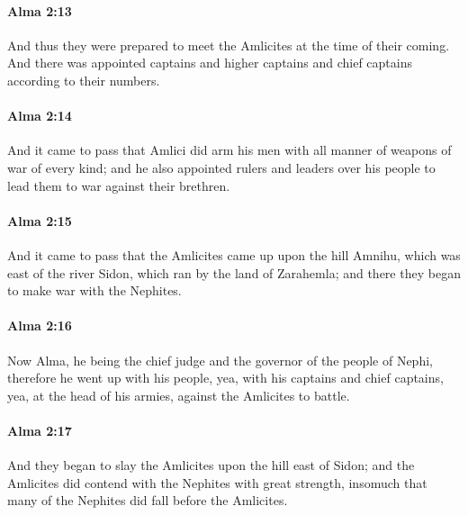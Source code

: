 		\paragraph{Alma 2:13} %
			\label{ALMA-2-13}

			And thus they were prepared to meet the Amlicites at the time of their coming.
			And there was appointed captains and higher captains and chief captains
			according to their numbers.

		\paragraph{Alma 2:14} %
			\label{ALMA-2-14}

			And it came to pass that Amlici did arm his men
			with all manner of weapons of war of every kind;
			and he also appointed rulers and leaders over his people
			to lead them to war against their brethren.

		\paragraph{Alma 2:15} %
			\label{ALMA-2-15}

			And it came to pass that the Amlicites came up upon the hill Amnihu,
			which was east of the river Sidon,
			which ran by the land of Zarahemla;
			and there they began to make war with the Nephites.

		\paragraph{Alma 2:16} %
			\label{ALMA-2-16}

			Now Alma, he being the chief judge and the governor of the people of Nephi,
			therefore he went up with his people,
			yea, with his captains and chief captains,
			yea, at the head of his armies,
			against the Amlicites to battle.

		\paragraph{Alma 2:17} %
			\label{ALMA-2-17}

			And they began to slay the Amlicites upon the hill east of Sidon;
			and the Amlicites did contend with the Nephites with great strength,
			insomuch that many of the Nephites did fall before the Amlicites.

